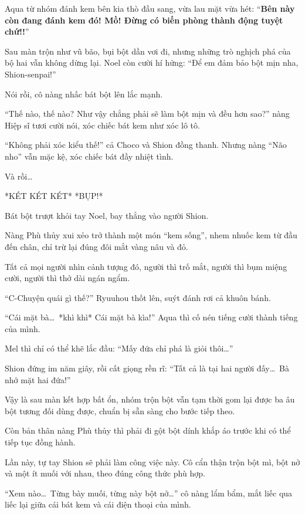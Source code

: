 \documentclass[../main.tex]{subfiles}
\begin{document}
Aqua từ nhóm đánh kem bên kia thò đầu sang, vừa lau mặt vừa hét: ``\textbf{Bên này còn đang đánh kem đó! Mồ! Đừng có biến phòng thành động tuyệt chứ!!}''

\ct

Sau màn trộn như vũ bão, bụi bột dần vơi đi, nhưng những trò nghịch phá của bộ hai vẫn không dừng lại. Noel còn cười hí hửng: ``Để em đảm bảo bột mịn nha, Shion-senpai!''

Nói rồi, cô nàng nhấc bát bột lên lắc mạnh.

``Thế nào, thế nào? Như vậy chẳng phải sẽ làm bột mịn và đều hơn sao?'' nàng Hiệp sĩ tươi cười nói, xóc chiếc bát kem như xóc lô tô.

``Không phải xóc kiểu thế!'' cả Choco và Shion đồng thanh. Nhưng nàng ``Não nho'' vẫn mặc kệ, xóc chiếc bát đầy nhiệt tình.

Và rồi\dots

*KÉT KÉT KÉT* *BỤP!*

Bát bột trượt khỏi tay Noel, bay thẳng vào người Shion.

Nàng Phù thủy xui xẻo trở thành một món ``kem sống'', nhem nhuốc kem từ đầu đến chân, chỉ trừ lại đúng đôi mắt vàng nâu và đỏ.

Tất cả mọi người nhìn cảnh tượng đó, người thì trố mắt, người thì bụm miệng cười, người thì thở dài ngán ngẩm.

``C-Chuyện quái gì thế?'' Ryuuhou thốt lên, suýt đánh rơi cả khuôn bánh.

``Cái mặt bà\dots\ *khì khì* Cái mặt bà kìa!'' Aqua thì cố nén tiếng cười thành tiếng của mình.

Mel thì chỉ có thể khẽ lắc đầu: ``Mấy đứa chỉ phá là giỏi thôi\dots''

Shion đứng im năm giây, rồi cất giọng rền rĩ: ``Tất cả là tại hai người đấy\dots\ Bà nhớ mặt hai đứa!''

Vậy là sau màn kết hợp bất ổn, nhóm trộn bột vẫn tạm thời gom lại được ba âu bột tương đối dùng được, chuẩn bị sẵn sàng cho bước tiếp theo.

Còn bản thân nàng Phù thủy thì phải đi gột bột dính khắp áo trước khi có thể tiếp tục đồng hành.

\ct

Lần này, tự tay Shion sẽ phải làm công việc này. Cô cẩn thận trộn bột mì, bột nở và một ít muối với nhau, theo đúng công thức phù hợp.

``Xem nào\dots\ Từng bày muối, từng này bột nở\dots'' cô nàng lẩm bẩm, mắt liếc qua liếc lại giữa cái bát kem và cái điện thoại của mình.
\end{document}
